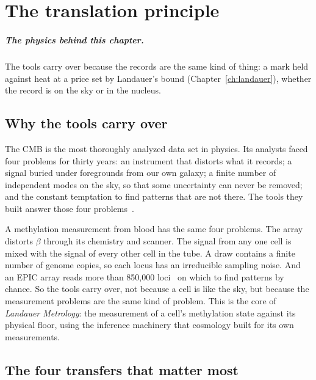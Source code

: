 \chapter{The translation principle}\label{ch:translation}

\paragraph{The physics behind this chapter.} The tools carry over because the records are the same kind of thing: a mark held against heat at a price set by Landauer's bound (Chapter~\ref{ch:landauer}), whether the record is on the sky or in the nucleus.

\section{Why the tools carry over}

The CMB is the most thoroughly analyzed data set in physics. Its analysts faced four problems for thirty years: an
instrument that distorts what it records; a signal buried under foregrounds from our own galaxy; a finite number of
independent modes on the sky, so that some uncertainty can never be removed; and the constant temptation to find
patterns that are not there. The tools they built answer those four problems~\cite{Planck2018I,Planck2018IV}.

A methylation measurement from blood has the same four problems. The array distorts $\beta$ through its chemistry and
scanner. The signal from any one cell is mixed with the signal of every other cell in the tube. A draw contains a finite
number of genome copies, so each locus has an irreducible sampling noise. And an EPIC array reads more than 850,000 loci~\cite{Fortin2017} on which
to find patterns by chance. So the tools carry over, not because a cell is like the sky, but because the measurement
problems are the same kind of problem. This is the core of \emph{Landauer Metrology}: the measurement of a cell's
methylation state against its physical floor, using the inference machinery that cosmology built for its own
measurements.

\section{The four transfers that matter most}

